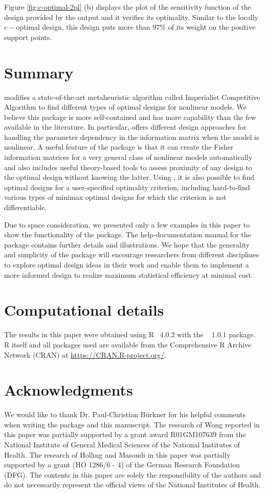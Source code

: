 Figure \ref{fig:c-optimal-2pl} (b) displays the plot of the sensitivity function of the design provided by the output  and it verifies its optimality.
Similar to the locally  $c-$optimal design, this design puts more than  $97\%$  of its weight on the positive support points.
\section{Summary}
\label{sec:summary}

 modifies a state-of-the-art metaheuristic algorithm called Imperialist Competitive Algorithm   to find  different types of optimal designs for nonlinear models. We believe this package is more self-contained and has more capability than the few available in the literature. In particular,  offers different design approaches  for handling the parameter dependency in the information matrix when the model is nonlinear. A useful feature of the   package is that it can  create  the Fisher information matrices for a very general class of  nonlinear models automatically and also includes useful theory-based tools   to assess proximity of any design to the   optimal design without knowing the latter.
Using , it is also possible  to find optimal designs for a user-specified optimality criterion, including hard-to-find various types of minimax   optimal designs for which the criterion is not differentiable.

Due to space consideration, we presented only a few   examples in this paper to   show the functionality of the package.
The help-documentation manual for the package contains further details and illustrations.  We hope that the generality and simplicity of the  package will encourage researchers from different disciplines  to explore  optimal design ideas in their work and enable them to implement a more informed design to realize maximum statistical efficiency at minimal cost.


\section*{Computational details}
The results in this paper were obtained using
R~  4.0.2  with the
~ 1.0.1 package. R itself
and all packages used are available from the Comprehensive
R Archive Network (CRAN) at
\url{https://CRAN.R-project.org/}.


\section*{Acknowledgments}
We would like to thank Dr. Paul-Christian B\"urkner for his  helpful comments when writing the package and this manuscript.
The research of Wong reported in this paper was partially supported by a grant award R01GM107639 from the National Institute of General Medical Sciences of the National Institutes of Health.
The research of Holling and Masoudi  in this paper was partially supported by a grant (HO 1286/6 - 4) of the German Research Foundation (DFG).
The contents in this paper are solely the responsibility of the authors and do not necessarily represent the official views of the National Institutes of Health.


